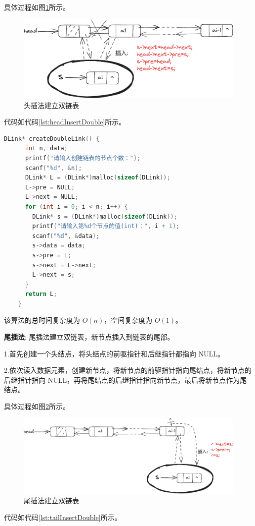 \documentclass[lang=cn,newtx,10pt,scheme=chinese]{../elegantbook}
\begin{document}
  具体过程如图\ref{fig:headInsertDouble}所示。
  \begin{figure}[h]
    \centering
    \includegraphics[width=1\textwidth]{./figure/pdf/cropped/headInsertDL.pdf}
    \caption{头插法建立双链表}
    \label{fig:headInsertDouble}
  \end{figure}
  代码如代码\ref{lst:headInsertDouble}所示。
  \begin{lstlisting}[language=C++, caption={头插法建立双链表示例代码}, label={lst:headInsertDouble}]
    DLink* createDoubleLink() {
      int n, data;
      printf("请输入创建链表的节点个数：");
      scanf("%d", &n);
      DLink* L = (DLink*)malloc(sizeof(DLink));
      L->pre = NULL;
      L->next = NULL;
      for (int i = 0; i < n; i++) {
        DLink* s = (DLink*)malloc(sizeof(DLink));
        printf("请输入第%d个节点的值(int)：", i + 1);
        scanf("%d", &data);
        s->data = data;
        s->pre = L;
        s->next = L->next;
        L->next = s;
      }
      return L;
    }
  \end{lstlisting}
  该算法的总时间复杂度为 $O(n)$，空间复杂度为 $O(1)$。
 
  \textbf{尾插法}:
  尾插法建立双链表，新节点插入到链表的尾部。

  1.首先创建一个头结点，将头结点的前驱指针和后继指针都指向 NULL。

  2.依次读入数据元素，创建新节点，将新节点的前驱指针指向尾结点，将新节点的后继指针指向 NULL，再将尾结点的后继指针指向新节点，最后将新节点作为尾结点。

  具体过程如图\ref{fig:tailInsertDouble}所示。
  \begin{figure}[h]
    \centering
    \includegraphics[width=1\textwidth]{./figure/pdf/cropped/tailInsertDL.pdf}
    \caption{尾插法建立双链表}
    \label{fig:tailInsertDouble}
  \end{figure}
  代码如代码\ref{lst:tailInsertDouble}所示。
\end{document}
